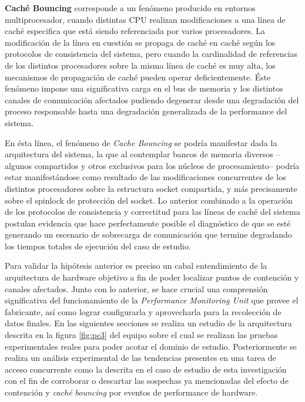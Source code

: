\begin{defn} \textbf{Caché Bouncing} corresponde a un fenómeno producido en entornos multiprocesador, cuando distintas CPU realizan modificaciones a una línea de caché especifica que está siendo referenciada por varios procesadores. La modificación de la línea en cuestión se propaga de caché en caché según los protocolos de consistencia del sistema, pero cuando la cardinalidad de referencias de los distintos procesadores sobre la misma línea de caché es muy alta, los mecanismos de propagación de caché pueden operar deficientemente. Éste fenómeno impone una significativa carga en el bus de memoria y los distintos canales de comunicación afectados pudiendo degenerar desde una degradación del proceso responsable hasta una degradación generalizada de la performance del sistema.
\end{defn}

En ésta línea, el fenómeno de \emph{Cache Bouncing} se podría manifestar dada la arquitectura del sistema, la que al contemplar bancos de memoria diversos --algunos compartidos y otros exclusivos para los núcleos de procesamiento-- podría estar manifestándose como resultado de las modificaciones concurrentes de los distintos procesadores sobre la estructura socket compartida, y más precisamente sobre el spinlock de protección del socket. Lo anterior combinado a la operación de los protocolos de consistencia y correctitud para las líneas de caché del sistema postulan evidencia que hace perfectamente posible el diagnóstico de que se esté generando un escenario de sobrecarga de comunicación que termine degradando los tiempos totales de ejecución del caso de estudio.

Para validar la hipótesis anterior es preciso un cabal entendimiento de la arquitectura de hardware objetivo a fin de poder localizar puntos de contención y canales afectados. Junto con lo anterior, se hace crucial una comprensión significativa del funcionamiento de la \emph{Performance Monitoring Unit} que provee el fabricante, así como lograr configurarla y aprovecharla para la recolección de datos finales. En las siguientes secciones se realiza un estudio de la arquitectura descrita en la figura \ref{fig:pc3} del equipo sobre el cual se realizan las pruebas experimentales reales para poder acotar el dominio de estudio. Posteriormente se realiza un análisis experimental de las tendencias presentes en una tarea de acceso concurrente como la descrita en el caso de estudio de esta investigación con el fin de corroborar o descartar las sospechas ya mencionadas del efecto de contención y \emph{caché bouncing} por eventos de performance de hardware.

